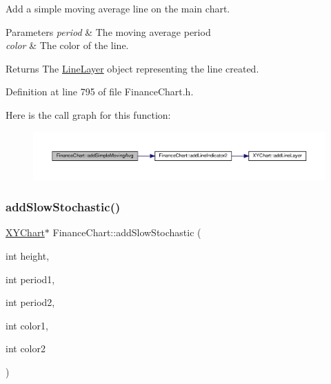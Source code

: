 Add a simple moving average line on the main chart. 


\begin{DoxyParams}{Parameters}
{\em period} & The moving average period\\
\hline
{\em color} & The color of the line.\\
\hline
\end{DoxyParams}
\begin{DoxyReturn}{Returns}
The \hyperlink{class_line_layer}{Line\+Layer} object representing the line created.
\end{DoxyReturn}


Definition at line 795 of file Finance\+Chart.\+h.

Here is the call graph for this function\+:
\nopagebreak
\begin{figure}[H]
\begin{center}
\leavevmode
\includegraphics[width=350pt]{class_finance_chart_a7fdf86b7ceb129bd035612be20fbe6ba_cgraph}
\end{center}
\end{figure}
\mbox{\label{class_finance_chart_a2f1d675f9a5e8f280b4f16d3a36eb204}} 
\subsubsection{\texorpdfstring{add\+Slow\+Stochastic()}{addSlowStochastic()}}
{\footnotesize\ttfamily \hyperlink{class_x_y_chart}{X\+Y\+Chart}$\ast$ Finance\+Chart\+::add\+Slow\+Stochastic (\begin{DoxyParamCaption}\item[{int}]{height,  }\item[{int}]{period1,  }\item[{int}]{period2,  }\item[{int}]{color1,  }\item[{int}]{color2 }\end{DoxyParamCaption})\hspace{0.3cm}{\ttfamily [inline]}}



